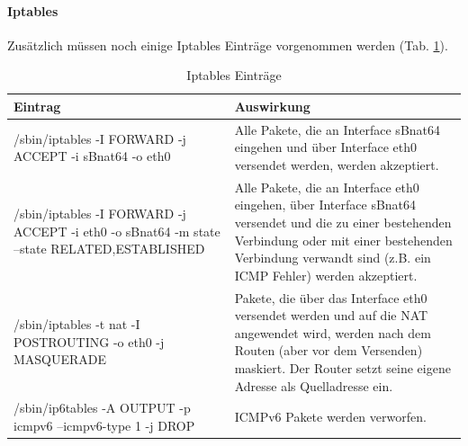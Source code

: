 \paragraph*{Iptables}
Zusätzlich müssen noch einige Iptables Einträge vorgenommen werden (Tab. \ref{tab:IptablesEintraege}).
\begin{table}
	\centering
		\begin{tabular}{p{6cm}p{9cm}}
			Eintrag & Auswirkung \\ \hline
			/sbin/iptables -I FORWARD -j ACCEPT -i sBnat64 -o eth0 & Alle Pakete, die an Interface sBnat64 eingehen und über Interface eth0 versendet werden, werden akzeptiert. \\ \hline
			/sbin/iptables -I FORWARD -j ACCEPT -i eth0 -o sBnat64 -m state --state RELATED,ESTABLISHED & Alle Pakete, die an Interface eth0 eingehen, über Interface sBnat64 versendet und die zu einer bestehenden Verbindung oder mit einer bestehenden Verbindung verwandt sind (z.B. ein ICMP Fehler) werden akzeptiert. \\ \hline
			/sbin/iptables -t nat -I POSTROUTING -o eth0 -j MASQUERADE & Pakete, die über das Interface eth0 versendet werden und auf die NAT angewendet wird, werden nach dem Routen (aber vor dem Versenden) maskiert. Der Router setzt seine eigene Adresse als Quelladresse ein. \\ \hline
			/sbin/ip6tables -A OUTPUT -p icmpv6 --icmpv6-type 1 -j DROP & ICMPv6 Pakete werden verworfen. \\
		\end{tabular}
	\caption{Iptables Einträge}
	\label{tab:IptablesEintraege}
\end{table}

